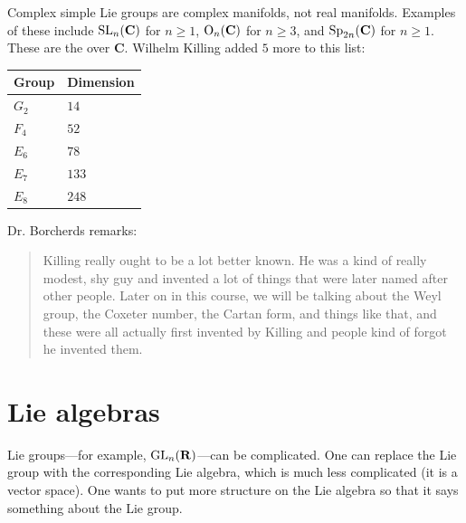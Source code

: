 \documentclass [11 pt, twoside] {article}
\begin{document}
Complex simple Lie groups are complex manifolds, not real manifolds. Examples of these include $\operatorname{SL}_{n}(\mathbf{C})$ for $n\ge 1$, $\operatorname{O}_{n}(\mathbf{C})$ for $n\ge 3$, and $\operatorname{Sp}_{2n}(\mathbf{C})$ for $n\ge 1$. These are the  over $\mathbf{C}$.
Wilhelm Killing added $5$ more to this list:
\begin{center}
\begin{tabular}{ll}
    Group & Dimension\\
    \midrule
    $G_2$ & $14$\\
    $F_4$ & $52$\\
    $E_6$ & $78$\\
    $E_7$ & $133$\\
    $E_8$ & $248$
\end{tabular}
\end{center}
Dr. Borcherds remarks:
\begin{quote}
	\small Killing really ought to be a lot better known. He was a kind of really modest, shy guy and invented a lot of things that were later named after other people. Later on in this course, we will be talking about the Weyl group, the Coxeter number, the Cartan form, and things like that, and these were all actually first invented by Killing and people kind of forgot he invented them.
\end{quote}

\section {Lie algebras}
Lie groups---for example, $\operatorname{GL}_{n}(\mathbf{R})$---can be complicated.
One can replace the Lie group with the corresponding Lie algebra, which is much less complicated (it is a vector space).
One wants to put more structure on the Lie algebra so that it says something about the Lie group.
\end{document}
